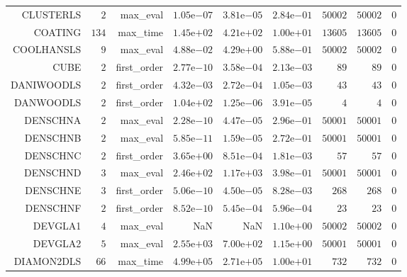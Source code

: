 \begin{longtable}{rrrrrrrrr}
CLUSTERLS & \(     2\) & max\_eval & \( 1.05\)e\(-07\) & \( 3.81\)e\(-05\) & \( 2.84\)e\(-01\) & \( 50002\) & \( 50002\) & \(     0\) \\
COATING & \(   134\) & max\_time & \( 1.45\)e\(+02\) & \( 4.21\)e\(+02\) & \( 1.00\)e\(+01\) & \( 13605\) & \( 13605\) & \(     0\) \\
COOLHANSLS & \(     9\) & max\_eval & \( 4.88\)e\(-02\) & \( 4.29\)e\(+00\) & \( 5.88\)e\(-01\) & \( 50002\) & \( 50002\) & \(     0\) \\
CUBE & \(     2\) & first\_order & \( 2.77\)e\(-10\) & \( 3.58\)e\(-04\) & \( 2.13\)e\(-03\) & \(    89\) & \(    89\) & \(     0\) \\
DANIWOODLS & \(     2\) & first\_order & \( 4.32\)e\(-03\) & \( 2.72\)e\(-04\) & \( 1.05\)e\(-03\) & \(    43\) & \(    43\) & \(     0\) \\
DANWOODLS & \(     2\) & first\_order & \( 1.04\)e\(+02\) & \( 1.25\)e\(-06\) & \( 3.91\)e\(-05\) & \(     4\) & \(     4\) & \(     0\) \\
DENSCHNA & \(     2\) & max\_eval & \( 2.28\)e\(-10\) & \( 4.47\)e\(-05\) & \( 2.96\)e\(-01\) & \( 50001\) & \( 50001\) & \(     0\) \\
DENSCHNB & \(     2\) & max\_eval & \( 5.85\)e\(-11\) & \( 1.59\)e\(-05\) & \( 2.72\)e\(-01\) & \( 50001\) & \( 50001\) & \(     0\) \\
DENSCHNC & \(     2\) & first\_order & \( 3.65\)e\(+00\) & \( 8.51\)e\(-04\) & \( 1.81\)e\(-03\) & \(    57\) & \(    57\) & \(     0\) \\
DENSCHND & \(     3\) & max\_eval & \( 2.46\)e\(+02\) & \( 1.17\)e\(+03\) & \( 3.98\)e\(-01\) & \( 50001\) & \( 50001\) & \(     0\) \\
DENSCHNE & \(     3\) & first\_order & \( 5.06\)e\(-10\) & \( 4.50\)e\(-05\) & \( 8.28\)e\(-03\) & \(   268\) & \(   268\) & \(     0\) \\
DENSCHNF & \(     2\) & first\_order & \( 8.52\)e\(-10\) & \( 5.45\)e\(-04\) & \( 5.96\)e\(-04\) & \(    23\) & \(    23\) & \(     0\) \\
DEVGLA1 & \(     4\) & max\_eval &       NaN &       NaN & \( 1.10\)e\(+00\) & \( 50002\) & \( 50002\) & \(     0\) \\
DEVGLA2 & \(     5\) & max\_eval & \( 2.55\)e\(+03\) & \( 7.00\)e\(+02\) & \( 1.15\)e\(+00\) & \( 50001\) & \( 50001\) & \(     0\) \\
DIAMON2DLS & \(    66\) & max\_time & \( 4.99\)e\(+05\) & \( 2.71\)e\(+05\) & \( 1.00\)e\(+01\) & \(   732\) & \(   732\) & \(     0\) \\

\end{longtable}
